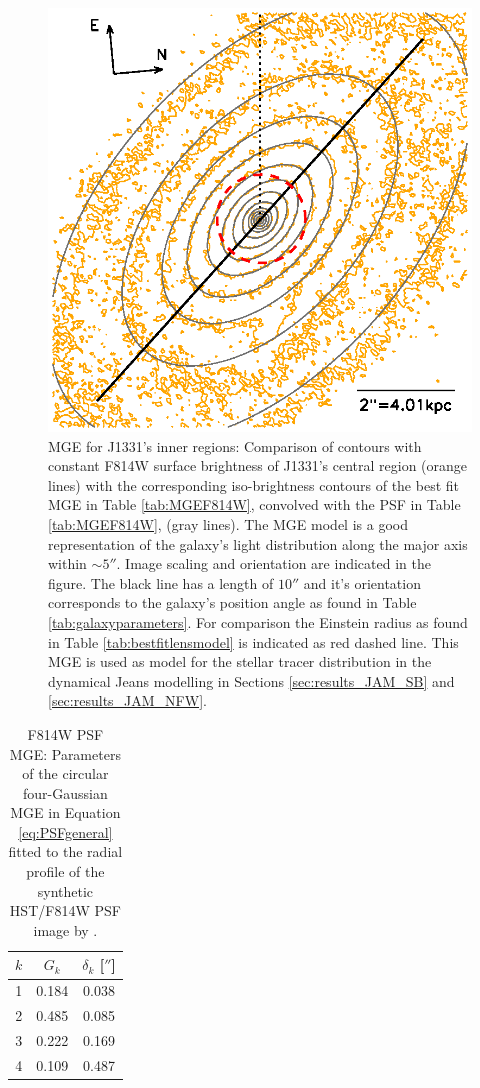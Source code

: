\begin{figure}
\centering
\includegraphics[width=0.8\columnwidth]{fig/1331F814Wsci_MGE_M.ps}
\caption{MGE for J1331's inner regions: Comparison of contours with constant F814W surface brightness of J1331's central region (orange lines) with the corresponding iso-brightness contours of the best fit MGE in Table \ref{tab:MGEF814W}, convolved with the PSF in Table \ref{tab:MGEF814W}, (gray lines). The MGE model is a good representation of the galaxy's light distribution along the major axis within $\sim 5''$. Image scaling and orientation are indicated in the figure. The black line has a length of $10''$ and it's orientation corresponds to the galaxy's position angle as found in Table \ref{tab:galaxyparameters}. For comparison the Einstein radius as found in Table \ref{tab:bestfitlensmodel}  is indicated as red dashed line. This MGE is used as model for the stellar tracer distribution in the dynamical Jeans modelling in Sections \ref{sec:results_JAM_SB} and \ref{sec:results_JAM_NFW}.}
\label{fig:MGEinnerRegions}
\end{figure}

\begin{table}
\centering
\caption{F814W PSF MGE: Parameters of the circular four-Gaussian MGE in Equation \ref{eq:PSFgeneral} fitted to the radial profile of the synthetic HST/F814W PSF image by \Wilma{[TO DO: WHO???]}.}
\begin{tabular}{ccc}
\hline
$k$ & $G_k$ & $\delta_k$ [$''$] \\\hline
1 & 0.184 & 0.038\\
2 & 0.485 & 0.085\\
3 & 0.222 & 0.169\\
4 & 0.109 & 0.487\\\hline
\end{tabular}
\label{tab:PSFMGEF814W}
\end{table}

